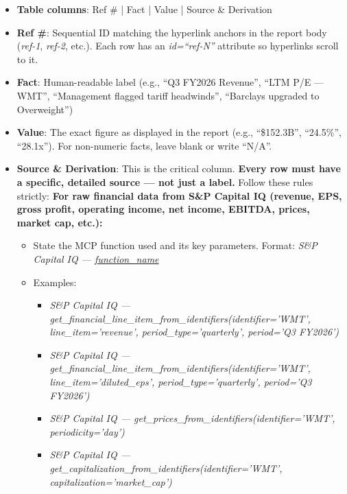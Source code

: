 \documentclass[11pt]{article}
\begin{document}
\begin{itemize}[leftmargin=*,itemsep=2pt,topsep=2pt]
\item {} \textbf{Table columns}: Ref \# | Fact | Value | Source \& Derivation
\item {} \textbf{Ref \#}: Sequential ID matching the hyperlink anchors in the report body (\emph{ref-1}, \emph{ref-2}, etc.). Each row has an \emph{id=``ref-N''} attribute so hyperlinks scroll to it.
\item {} \textbf{Fact}: Human-readable label (e.g., ``Q3 FY2026 Revenue'', ``LTM P/E — WMT'', ``Management flagged tariff headwinds'', ``Barclays upgraded to Overweight'')
\item {} \textbf{Value}: The exact figure as displayed in the report (e.g., ``\$152.3B'', ``24.5\%'', ``28.1x''). For non-numeric facts, leave blank or write ``N/A''.
\item {} \textbf{Source \& Derivation}: This is the critical column. \textbf{Every row must have a specific, detailed source — not just a label.} Follow these rules strictly: \textbf{For raw financial data from S\&P Capital IQ (revenue, EPS, gross profit, operating income, net income, EBITDA, prices, market cap, etc.):}
\begin{itemize}[leftmargin=*,itemsep=2pt,topsep=2pt]
\item {} State the MCP function used and its key parameters. Format: \emph{S\&P Capital IQ — \href{identifier='[TICKER]', line\_\allowbreak{}item='[item]', period\_\allowbreak{}type='[type]', period='[Q\# FY\#\#\#\#]'}{function\_\allowbreak{}name}}
\item {} Examples:
\begin{itemize}[leftmargin=*,itemsep=2pt,topsep=2pt]
\item {} \emph{S\&P Capital IQ — get\_\allowbreak{}financial\_\allowbreak{}line\_\allowbreak{}item\_\allowbreak{}from\_\allowbreak{}identifiers(identifier='WMT', line\_\allowbreak{}item='revenue', period\_\allowbreak{}type='quarterly', period='Q3 FY2026')}
\item {} \emph{S\&P Capital IQ — get\_\allowbreak{}financial\_\allowbreak{}line\_\allowbreak{}item\_\allowbreak{}from\_\allowbreak{}identifiers(identifier='WMT', line\_\allowbreak{}item='diluted\_\allowbreak{}eps', period\_\allowbreak{}type='quarterly', period='Q3 FY2026')}
\item {} \emph{S\&P Capital IQ — get\_\allowbreak{}prices\_\allowbreak{}from\_\allowbreak{}identifiers(identifier='WMT', periodicity='day')}
\item {} \emph{S\&P Capital IQ — get\_\allowbreak{}capitalization\_\allowbreak{}from\_\allowbreak{}identifiers(identifier='WMT', capitalization='market\_\allowbreak{}cap')}

\end{itemize}
\end{itemize}
\end{itemize}
\end{document}
